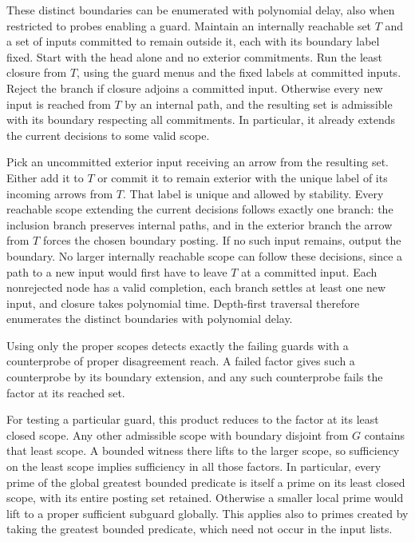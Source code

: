 These distinct boundaries can be enumerated with
polynomial delay, also when restricted to probes
enabling a guard. Maintain an internally reachable
set $T$ and a set of inputs committed to remain
outside it, each with its boundary label fixed.
Start with the head alone and no exterior
commitments. Run the least closure from $T$,
using the guard menus and the fixed labels at
committed inputs. Reject the branch if closure
adjoins a committed input. Otherwise every
new input is reached from $T$ by an internal
path, and the resulting set is admissible
with its boundary respecting all commitments.
In particular, it already extends the current
decisions to some valid scope.

Pick an uncommitted exterior input receiving
an arrow from the resulting set. Either add it
to $T$ or commit it to remain exterior with
the unique label of its incoming arrows from
$T$. That label is unique and allowed by
stability. Every reachable scope extending the
current decisions follows exactly one branch:
the inclusion branch preserves internal paths,
and in the exterior branch the arrow from
$T$ forces the chosen boundary posting. If no
such input remains, output the boundary. No
larger internally reachable scope can follow
these decisions, since a path to a new input
would first have to leave $T$ at a committed
input. Each nonrejected node has a valid
completion, each branch settles at least one
new input, and closure takes polynomial time.
Depth-first traversal therefore enumerates the
distinct boundaries with polynomial delay.

Using only the proper scopes detects exactly
the failing guards with a counterprobe of
proper disagreement reach. A failed factor
gives such a counterprobe by its boundary
extension, and any such counterprobe fails
the factor at its reached set.

For testing a particular guard, this product
reduces to the factor at its least closed
scope. Any other admissible scope with boundary
disjoint from $G$ contains that least scope.
A bounded witness there lifts to the larger
scope, so sufficiency on the least scope
implies sufficiency in all those factors.
In particular, every prime of the global
greatest bounded predicate is itself a prime on
its least closed scope, with its entire posting
set retained. Otherwise a smaller local prime
would lift to a proper sufficient subguard
globally. This applies also to primes created
by taking the greatest bounded predicate,
which need not occur in the input lists.

